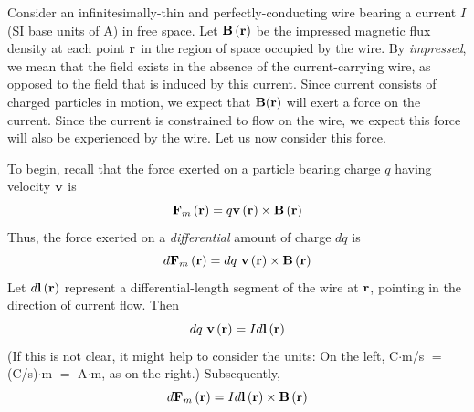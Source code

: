 

\label{m0017_Magnetic_Force_Current-Carrying_Wire} %

Consider an infinitesimally-thin and perfectly-conducting wire bearing a current $I$ (SI base units of A) in free space.  
Let ${\bf B}\left({\bf r}\right)$ be the impressed magnetic flux density at each point ${\bf r}$ in the region of space occupied by the wire.
By \emph{impressed}, we mean that the field exists in the absence of the current-carrying wire, as opposed to the field that is induced by this current.
Since current consists of charged particles in motion, we expect that ${\bf B}({\bf r})$ will exert a force on the current. 
Since the current is constrained to flow on the wire, we expect this force will also be experienced by the wire.
Let us now consider this force.

To begin, recall that the force exerted on a particle bearing charge $q$ having velocity ${\bf v}$ is
%
\begin{equation}
{\bf F}_m\left({\bf r}\right) = q{\bf v}\left({\bf r}\right) \times {\bf B}\left({\bf r}\right) 
\end{equation}
%
Thus, the force exerted on a \emph{differential} amount of charge $dq$ is
%
\begin{equation}
d{\bf F}_m\left({\bf r}\right) = dq~{\bf v}\left({\bf r}\right) \times {\bf B}\left({\bf r}\right) 
\end{equation}
%
Let $d{\bf l}\left({\bf r}\right)$ represent a differential-length segment of the wire at ${\bf r}$, pointing in the direction of current flow.
Then 
%
\begin{equation}
dq~{\bf v}\left({\bf r}\right) = I d{\bf l}\left({\bf r}\right)
\end{equation}
%
(If this is not clear, it might help to consider the units:
On the left, C$\cdot$m/s $=$ (C/s)$\cdot$m $=$ A$\cdot$m, as on the right.)
Subsequently,
\begin{equation} 
d{\bf F}_m\left({\bf r}\right) = I d{\bf l}\left({\bf r}\right) \times {\bf B}\left({\bf r}\right) 
\label{m0017_edmforce}
\end{equation} 

